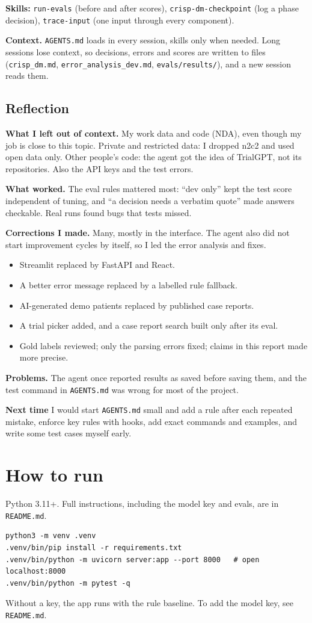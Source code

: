\documentclass[11pt,a4paper]{article}
\begin{document}
\textbf{Skills:} \texttt{run-evals} (before and after scores), \texttt{crisp-dm-checkpoint} (log a phase decision), \texttt{trace-input} (one input through every component).

\textbf{Context.} \texttt{AGENTS.md} loads in every session, skills only when needed. Long sessions lose context, so decisions, errors and scores are written to files (\texttt{crisp\_dm.md}, \texttt{error\_analysis\_dev.md}, \texttt{evals/results/}), and a new session reads them.

\subsection*{Reflection}

\textbf{What I left out of context.} My work data and code (NDA), even though my job is close to this topic. Private and restricted data: I dropped n2c2 and used open data only. Other people's code: the agent got the idea of TrialGPT, not its repositories. Also the API keys and the test errors.

\textbf{What worked.} The eval rules mattered most: ``dev only'' kept the test score independent of tuning, and ``a decision needs a verbatim quote'' made answers checkable. Real runs found bugs that tests missed.

\textbf{Corrections I made.} Many, mostly in the interface. The agent also did not start improvement cycles by itself, so I led the error analysis and fixes.
\begin{itemize}
  \item Streamlit replaced by FastAPI and React.
  \item A better error message replaced by a labelled rule fallback.
  \item AI-generated demo patients replaced by published case reports.
  \item A trial picker added, and a case report search built only after its eval.
  \item Gold labels reviewed; only the parsing errors fixed; claims in this report made more precise.
\end{itemize}

\textbf{Problems.} The agent once reported results as saved before saving them, and the test command in \texttt{AGENTS.md} was wrong for most of the project.

\textbf{Next time} I would start \texttt{AGENTS.md} small and add a rule after each repeated mistake, enforce key rules with hooks, add exact commands and examples, and write some test cases myself early.

\section{How to run}

Python 3.11+. Full instructions, including the model key and evals, are in \texttt{README.md}.
\begin{verbatim}
python3 -m venv .venv
.venv/bin/pip install -r requirements.txt
.venv/bin/python -m uvicorn server:app --port 8000   # open localhost:8000
.venv/bin/python -m pytest -q
\end{verbatim}
Without a key, the app runs with the rule baseline. To add the model key, see \texttt{README.md}.
\end{document}
